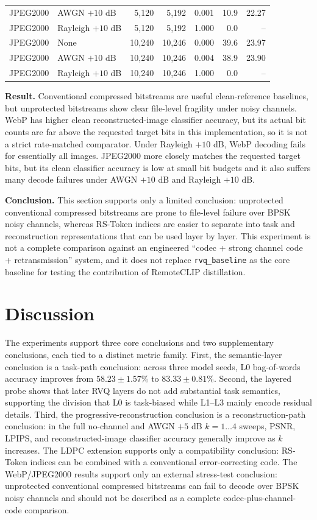 \documentclass[lettersize,journal]{IEEEtran}
\begin{document}
\begin{table}[!t]
\begin{tabular}{@{}llrrrrr@{}}
JPEG2000 & AWGN $+10$ dB & 5{,}120 & 5{,}192 & 0.001 & 10.9 & 22.27 \\
JPEG2000 & Rayleigh $+10$ dB & 5{,}120 & 5{,}192 & 1.000 & 0.0 & -- \\
JPEG2000 & None & 10{,}240 & 10{,}246 & 0.000 & 39.6 & 23.97 \\
JPEG2000 & AWGN $+10$ dB & 10{,}240 & 10{,}246 & 0.004 & 38.9 & 23.90 \\
JPEG2000 & Rayleigh $+10$ dB & 10{,}240 & 10{,}246 & 1.000 & 0.0 & -- \\
\bottomrule
\end{tabular}
\end{table}

\textbf{Result.} Conventional compressed bitstreams are useful clean-reference baselines, but unprotected bitstreams show clear file-level fragility under noisy channels. WebP has higher clean reconstructed-image classifier accuracy, but its actual bit counts are far above the requested target bits in this implementation, so it is not a strict rate-matched comparator. Under Rayleigh $+10$ dB, WebP decoding fails for essentially all images. JPEG2000 more closely matches the requested target bits, but its clean classifier accuracy is low at small bit budgets and it also suffers many decode failures under AWGN $+10$ dB and Rayleigh $+10$ dB.

\textbf{Conclusion.} This section supports only a limited conclusion: unprotected conventional compressed bitstreams are prone to file-level failure over BPSK noisy channels, whereas RS-Token indices are easier to separate into task and reconstruction representations that can be used layer by layer. This experiment is not a complete comparison against an engineered ``codec + strong channel code + retransmission'' system, and it does not replace \texttt{rvq\_baseline} as the core baseline for testing the contribution of RemoteCLIP distillation.

\section{Discussion}
The experiments support three core conclusions and two supplementary conclusions, each tied to a distinct metric family. First, the semantic-layer conclusion is a task-path conclusion: across three model seeds, L0 bag-of-words accuracy improves from $58.23\pm1.57\%$ to $83.33\pm0.81\%$. Second, the layered probe shows that later RVQ layers do not add substantial task semantics, supporting the division that L0 is task-biased while L1--L3 mainly encode residual details. Third, the progressive-reconstruction conclusion is a reconstruction-path conclusion: in the full no-channel and AWGN $+5$ dB $k=1\ldots4$ sweeps, PSNR, LPIPS, and reconstructed-image classifier accuracy generally improve as $k$ increases. The LDPC extension supports only a compatibility conclusion: RS-Token indices can be combined with a conventional error-correcting code. The WebP/JPEG2000 results support only an external stress-test conclusion: unprotected conventional compressed bitstreams can fail to decode over BPSK noisy channels and should not be described as a complete codec-plus-channel-code comparison.
\end{document}
